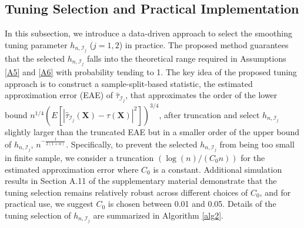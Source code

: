 \documentclass[11pt]{article}
\theoremstyle{referenceplain}
\theoremstyle{referencedefinition}
\theoremstyle{referenceremark}
\begin{document}
\subsection{Tuning Selection and Practical Implementation}
In this subsection, we introduce a data-driven approach to select the smoothing tuning parameter $h_{n,\mathcal{I}_j}$ ($j=1,2$) in practice. The proposed method guarantees that the selected $h_{n,\mathcal{I}_j}$ falls into the theoretical range required in Assumptions \ref{A5} and \ref{A6} with probability tending to 1. The key idea of the proposed tuning approach is to construct a sample-split-based statistic, the  estimated approximation error (EAE) of $\widehat{\tau}_{\mathcal{I}_j}$, that approximates the order of the lower bound $n^{1/4}\left(E[|\widehat{\tau}_{\mathcal{I}_j}(\mathbf{X})-\tau(\mathbf{X})|^2]\right)^{3/4}$, after truncation and select $h_{n,\mathcal{I}_j}$ slightly larger than the truncated EAE but in a smaller order of the upper bound of $h_{n,\mathcal{I}_j}$, $n^{-\frac{1}{2(1+\alpha)}}$. Specifically, to prevent the selected $h_{n,\mathcal{I}_j}$ from being too small in finite sample, we consider a truncation {$(\log(n)/(C_0 n))$} for the estimated approximation error where {$C_0$} is a constant. Additional simulation results in Section A.11 of the supplementary material demonstrate that the tuning selection remains relatively robust across different choices of {$C_0$}, and for practical use, we suggest {$C_0$} is chosen between 0.01 and 0.05. Details of the tuning selection of $h_{n,\mathcal{I}_j}$ are summarized in Algorithm \ref{alg2}.
\end{document}
